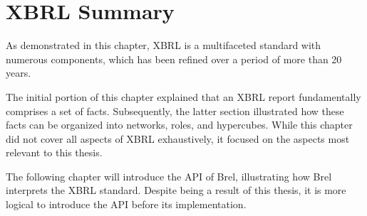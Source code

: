 \section{XBRL Summary}

As demonstrated in this chapter, XBRL is a multifaceted standard with numerous components,
which has been refined over a period of more than 20 years.

The initial portion of this chapter explained that an XBRL report fundamentally comprises a set of facts.
Subsequently, the latter section illustrated how these facts can be organized into networks, roles, and hypercubes.
While this chapter did not cover all aspects of XBRL exhaustively,
it focused on the aspects most relevant to this thesis.

The following chapter will introduce the API of Brel, 
illustrating how Brel interprets the XBRL standard.
Despite being a result of this thesis, it is more logical to introduce the API before its implementation.
